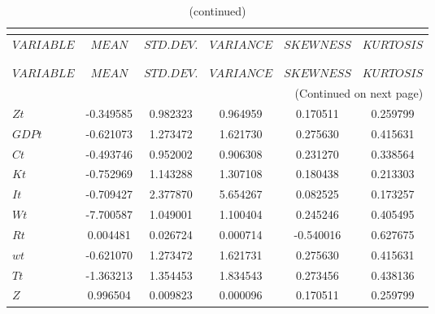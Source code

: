  
\begin{center}
\begin{longtable}{lccccc} 
\caption{MOMENTS OF SIMULATED VARIABLES}\\
 \label{Table:sim_moments}\\
\toprule 
$VARIABLE  $	 & 	 $            MEAN$	 & 	 $       STD. DEV.$	 & 	 $        VARIANCE$	 & 	 $        SKEWNESS$	 & 	 $        KURTOSIS$\\
\midrule \endfirsthead 
\caption{(continued)}\\
 \toprule \\ 
$VARIABLE  $	 & 	 $            MEAN$	 & 	 $       STD. DEV.$	 & 	 $        VARIANCE$	 & 	 $        SKEWNESS$	 & 	 $        KURTOSIS$\\
\midrule \endhead 
\midrule \multicolumn{6}{r}{(Continued on next page)} \\ \bottomrule \endfoot 
\bottomrule \endlastfoot 
$Zt        $	 & 	       -0.349585	 & 	        0.982323	 & 	        0.964959	 & 	        0.170511	 & 	        0.259799 \\ 
$GDPt      $	 & 	       -0.621073	 & 	        1.273472	 & 	        1.621730	 & 	        0.275630	 & 	        0.415631 \\ 
$Ct        $	 & 	       -0.493746	 & 	        0.952002	 & 	        0.906308	 & 	        0.231270	 & 	        0.338564 \\ 
$Kt        $	 & 	       -0.752969	 & 	        1.143288	 & 	        1.307108	 & 	        0.180438	 & 	        0.213303 \\ 
$It        $	 & 	       -0.709427	 & 	        2.377870	 & 	        5.654267	 & 	        0.082525	 & 	        0.173257 \\ 
$Wt        $	 & 	       -7.700587	 & 	        1.049001	 & 	        1.100404	 & 	        0.245246	 & 	        0.405495 \\ 
$Rt        $	 & 	        0.004481	 & 	        0.026724	 & 	        0.000714	 & 	       -0.540016	 & 	        0.627675 \\ 
$wt        $	 & 	       -0.621070	 & 	        1.273472	 & 	        1.621731	 & 	        0.275630	 & 	        0.415631 \\ 
$Tt        $	 & 	       -1.363213	 & 	        1.354453	 & 	        1.834543	 & 	        0.273456	 & 	        0.438136 \\ 
$Z         $	 & 	        0.996504	 & 	        0.009823	 & 	        0.000096	 & 	        0.170511	 & 	        0.259799 \\ 

\end{longtable}
\end{center}

